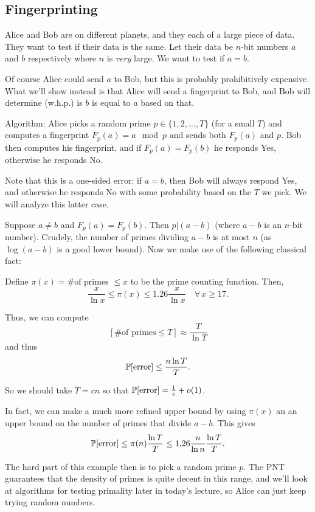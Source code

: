 \documentclass[11 pt]{scrartcl}
\begin{document}
\subsection{Fingerprinting}
\begin{example}
Alice and Bob are on different planets, and they each of a large piece of data. They want to test if their data is the same. Let their data be $n$-bit numbers $a$ and $b$ respectively where $n$ is \emph{very} large. We want to test if $a = b$. 

Of course Alice could send $a$ to Bob, but this is probably prohibitively expensive. What we'll show instead is that Alice will send a fingerprint to Bob, and Bob will determine (w.h.p.) is $b$ is equal to $a$ based on that. 

Algorithm: Alice picks a random prime $p \in \{1,2,\dots, T\}$ (for a small $T$) and computes a fingerprint $F_p(a) = a\mod p$ and sends both $F_p(a)$ and $p$. Bob then computes his fingerprint, and if $F_p(a) = F_p(b)$ he responds Yes, otherwise he responds No. 

Note that this is a one-sided error: if $a = b$, then Bob will always respond Yes, and otherwise he responds No with some probability based on the $T$ we pick. We will analyze this latter case. 

Suppose $a\not= b$ and $F_p(a) = F_p(b)$. Then $p | (a-b)$ (where $a-b$ is an $n$-bit number). Crudely, the number of primes dividing $a-b$ is at most $n$ (as $\log(a-b)$ is a good lower bound). Now we make use of the following classical fact:

\begin{theorem}
    Define $\pi(x) = \text{\# of primes }\leq x$ to be the prime counting function. Then, 
    \[ \dfrac{x}{\ln x} \leq \pi(x) \leq 1.26 \dfrac{x}{\ln x} \quad \forall\, x \geq 17.\] 
\end{theorem}

Thus, we can compute 
\[ [\text{\# of primes} \leq T] \approx \dfrac{T}{\ln T}\]
and thus 
\[ \mathbb P[\text{error}] \leq \dfrac{n\ln T}{T}.\] 

So we should take $T = cn$ so that $\mathbb P[\text{error}] = \frac{1}{c} + o(1)$. 

In fact, we can make a much more refined upper bound by using $\pi(x)$ an an upper bound on the number of primes that divide $a-b$. This gives 
\[ \mathbb P[\text{error}] \leq \pi(n) \dfrac{\ln T}{T} \leq 1.26 \dfrac{n}{\ln n}\dfrac{\ln T}{T}.\] 
\end{example}
The hard part of this example then is to pick a random prime $p$. The PNT guarantees that the density of primes is quite decent in this range, and we'll look at algorithms for testing primality later in today's lecture, so Alice can just keep trying random numbers. 
\end{document}

